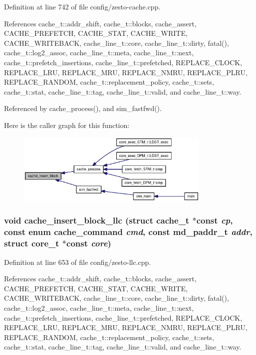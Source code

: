 Definition at line 742 of file config/zesto-cache.cpp.

References cache\_\-t::addr\_\-shift, cache\_\-t::blocks, cache\_\-assert, CACHE\_\-PREFETCH, CACHE\_\-STAT, CACHE\_\-WRITE, CACHE\_\-WRITEBACK, cache\_\-line\_\-t::core, cache\_\-line\_\-t::dirty, fatal(), cache\_\-t::log2\_\-assoc, cache\_\-line\_\-t::meta, cache\_\-line\_\-t::next, cache\_\-t::prefetch\_\-insertions, cache\_\-line\_\-t::prefetched, REPLACE\_\-CLOCK, REPLACE\_\-LRU, REPLACE\_\-MRU, REPLACE\_\-NMRU, REPLACE\_\-PLRU, REPLACE\_\-RANDOM, cache\_\-t::replacement\_\-policy, cache\_\-t::sets, cache\_\-t::stat, cache\_\-line\_\-t::tag, cache\_\-line\_\-t::valid, and cache\_\-line\_\-t::way.

Referenced by cache\_\-process(), and sim\_\-fastfwd().

Here is the caller graph for this function:\nopagebreak
\begin{figure}[H]
\begin{center}
\leavevmode
\includegraphics[width=263pt]{zesto-cache_8h_219ea5df10c94dbf2c820586f981158f_icgraph}
\end{center}
\end{figure}
\subsubsection[{cache\_\-insert\_\-block\_\-llc}]{\setlength{\rightskip}{0pt plus 5cm}void cache\_\-insert\_\-block\_\-llc (struct {\bf cache\_\-t} $\ast$const  {\em cp}, \/  const enum {\bf cache\_\-command} {\em cmd}, \/  const {\bf md\_\-paddr\_\-t} {\em addr}, \/  struct {\bf core\_\-t} $\ast$const  {\em core})}\label{zesto-cache_8h_abc5a15d6fe00d533a2b4b8e4b13cc59}




Definition at line 653 of file config/zesto-llc.cpp.

References cache\_\-t::addr\_\-shift, cache\_\-t::blocks, cache\_\-assert, CACHE\_\-PREFETCH, CACHE\_\-STAT, CACHE\_\-WRITE, CACHE\_\-WRITEBACK, cache\_\-line\_\-t::core, cache\_\-line\_\-t::dirty, fatal(), cache\_\-t::log2\_\-assoc, cache\_\-line\_\-t::meta, cache\_\-line\_\-t::next, cache\_\-t::prefetch\_\-insertions, cache\_\-line\_\-t::prefetched, REPLACE\_\-CLOCK, REPLACE\_\-LRU, REPLACE\_\-MRU, REPLACE\_\-NMRU, REPLACE\_\-PLRU, REPLACE\_\-RANDOM, cache\_\-t::replacement\_\-policy, cache\_\-t::sets, cache\_\-t::stat, cache\_\-line\_\-t::tag, cache\_\-line\_\-t::valid, and cache\_\-line\_\-t::way.
